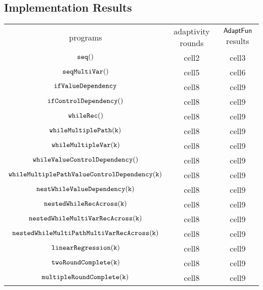 \subsection{Implementation Results}  
    \begin{center}
        \begin{tabular}{ c c c }
         programs & adaptivity rounds & $\textsf{AdaptFun}$ results \\ 
         $\mathtt{seq()}$ & cell2 & cell3 \\ 
         $\mathtt{seqMultiVar()}$ & cell5 & cell6 \\  
         $ \mathtt{ifValueDependency}$ & cell8 & cell9  \\
         $\mathtt{ifControlDependency()}$ & cell8 & cell9  \\
         $ \mathtt{whileRec()}$ & cell8 & cell9  \\
         $ \mathtt{whileMultiplePath(k)}$ & cell8 & cell9  \\
         $ \mathtt{whileMultipleVar(k)}$ & cell8 & cell9  \\
         $ \mathtt{whileValueControlDependency()}$ & cell8 & cell9  \\
         $ \mathtt{whileMultiplePathValueControlDependency(k)}$ & cell8 & cell9  \\
         $ \mathtt{nestWhileValueDependency(k)}$ & cell8 & cell9  \\
         $ \mathtt{nestedWhileRecAcross(k)}$ & cell8 & cell9  \\
         $ \mathtt{nestedWhileMultiVarRecAcross(k)}$ & cell8 & cell9  \\
         $ \mathtt{nestedWhileMultiPathMultiVarRecAcross(k)}$ & cell8 & cell9  \\
         $ \mathtt{linearRegression(k)}$ & cell8 & cell9  \\
         $ \mathtt{twoRoundComplete(k)}$ & cell8 & cell9  \\
         $ \mathtt{multipleRoundComplete(k)}$ & cell8 & cell9  \\
        \end{tabular}
        \end{center}
